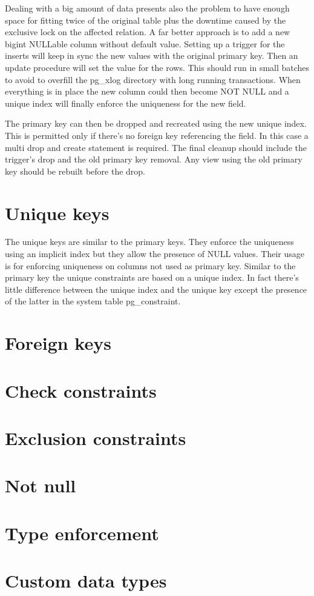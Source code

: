Dealing with a big amount of data presents also the problem to have enough space for fitting twice 
of the original table plus the downtime caused by the exclusive lock on the affected relation. A 
far better approach is to add a new bigint NULLable column without default value. Setting up a 
trigger for the inserts will keep in sync the new values with the original primary key. Then an 
update procedure will set the value for the rows. This should run in small batches to avoid to 
overfill the pg\_xlog directory with long running transactions. When everything is in place the new 
column could then become NOT NULL and a unique index will finally enforce the uniqueness for the 
new 
field. \newline

The primary key can then be dropped and recreated using the new unique index. This is permitted 
only if there's no foreign key referencing the field. In this case a multi drop and create 
statement is required. The final cleanup should include the trigger's drop and the old primary key 
removal. Any view using the old primary key should be rebuilt before the drop.

\section{Unique keys}
The unique keys are similar to the primary keys. They enforce the uniqueness using an implicit 
index but they allow the presence of NULL values. Their usage is for enforcing uniqueness on 
columns not used as primary key. Similar to the primary key the unique constraints are based on a 
unique index. In fact there's little difference between the unique index and the unique key except 
the presence of the latter in the system table pg\_constraint. 


\section{Foreign keys}
\section{Check constraints}
\section{Exclusion constraints}

\section{Not null}
\section{Type enforcement}
\section{Custom data types}

